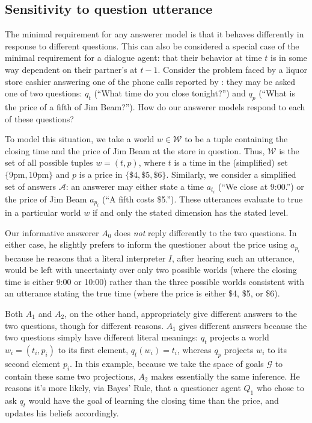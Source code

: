 \documentclass[11pt, floatsintext]{apa6}
\begin{document}
\subsection{Sensitivity to question utterance}

The minimal requirement for any answerer model is that it behaves differently in response to different questions. This can also be considered a special case of the minimal requirement for a dialogue agent: that their behavior at time $t$ is in some way dependent on their partner's at $t-1$. %
Consider the problem faced by a liquor store cashier answering one of the phone calls reported by : they may be asked one of two questions: $q_t$ (``What time do you close tonight?'') and $q_p$ (``What is the price of a fifth of Jim Beam?''). How do our answerer models respond to each of these questions?

To model this situation, we take a world $w \in \mathcal{W}$ to be a tuple containing the closing time and the price of Jim Beam at the store in question. Thus, $\mathcal{W}$ is the set of all possible tuples $w = (t, p)$, where $t$ is a time in the (simplified) set $\{9\textrm{pm},10\textrm{pm}\}$ and $p$ is a price in $\{\$4, \$5, \$6\}$. Similarly, we consider a simplified set of answers $\mathcal{A}$: an answerer may either state a time $a_{t_i}$ (``We close at 9:00.'') or the price of Jim Beam $a_{p_i}$  (``A fifth costs \$5.''). These utterances evaluate to true in a particular world $w$ if and only the stated dimension has the stated level.

Our informative answerer $A_0$ does \emph{not} reply differently to the two questions. In either case, he slightly prefers to inform the questioner about the price using $a_{p_i}$ because he reasons that a literal interpreter $I$, after hearing such an utterance, would be left with uncertainty over only two possible worlds (where the closing time is either 9:00 or 10:00) rather than the three possible worlds consistent with an utterance stating the true time (where the price is either \$4, \$5, or \$6).

Both $A_1$ and $A_2$, on the other hand, appropriately give different answers to the two questions, though for different reasons. $A_1$ gives different answers because the two questions simply have different literal meanings: $q_t$ projects a world $w_i = (t_i, p_i)$ to its first element, $q_t(w_i) = t_i$, whereas $q_p$ projects $w_i$ to its second element $p_i$. In this example, because we take the space of goals $\mathcal{G}$ to contain these same two projections, $A_2$ makes essentially the same inference. He reasons it's more likely, via Bayes' Rule, that a questioner agent $Q_1$ who chose to ask $q_t$ would have the goal of learning the closing time than the price, and updates his beliefs accordingly.
\end{document}
